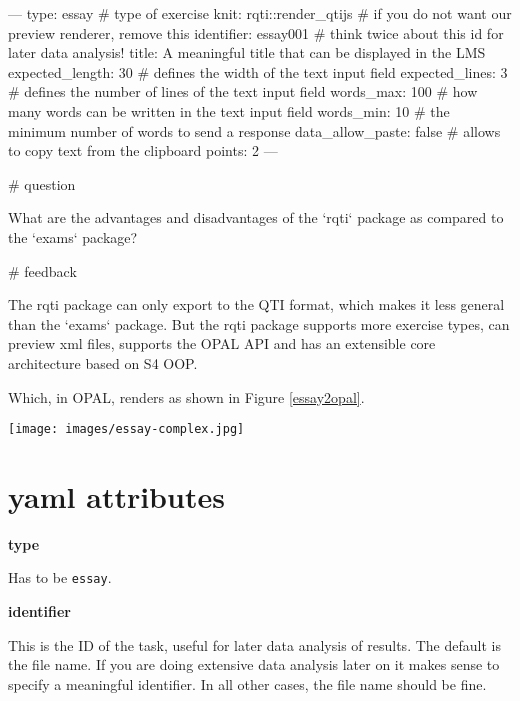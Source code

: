 \documentclass[twoside]{tufte-book}
\newenvironment{Shaded}{}{}
\begin{document}
\begin{Shaded}
\begin{Highlighting}
---
type: essay # type of exercise
knit: rqti::render_qtijs # if you do not want our preview renderer, remove this
identifier: essay001 # think twice about this id for later data analysis!
title: A meaningful title that can be displayed in the LMS
expected_length: 30 # defines the width of the text input field
expected_lines: 3 # defines the number of lines of the text input field
words_max: 100 # how many words can be written in the text input field
words_min: 10 # the minimum number of words to send a response
data_allow_paste: false # allows to copy text from the clipboard
points: 2
---

# question

What are the advantages and disadvantages of the `rqti` package as compared to
the `exams` package?

# feedback

The rqti package can only export to the QTI format, which makes it less general
than the `exams` package. But the rqti package supports more exercise types, can
preview xml files, supports the OPAL API and has an extensible core architecture
based on S4 OOP.
\end{Highlighting}
\end{Shaded}

Which, in OPAL, renders as shown in Figure \ref{essay2opal}.

\begin{figure*}
\centering
\texttt{[image: images/essay-complex.jpg]}
\caption{\label{essay2opal}More complex essay task rendered in OPAL}
\end{figure*}

\section{yaml attributes}\label{yaml-attributes-4}

\noindent\textbf{type}\label{type-4}

Has to be \texttt{essay}.

\noindent\textbf{identifier}\label{identifier-4}

This is the ID of the task, useful for later data analysis of results. The default is the file name. If you are doing extensive data analysis later on it makes sense to specify a meaningful identifier. In all other cases, the file name should be fine.
\end{document}
